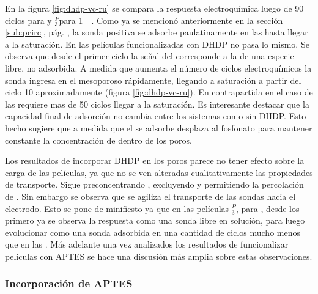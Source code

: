		    En la figura \ref{fig:dhdp-vc-ru} se compara la respuesta electroquímica luego de 90 ciclos para \pdmZ\space y \pdmZ$^P_3$\space para \ru\space \SI{1}{\milli\Molar}. Como ya se mencionó anteriormente en la sección \ref{sub:pcirc}, pág. \pageref{sub:pcirc}, la sonda positiva se adsorbe paulatinamente en las \pdmZ\space hasta llegar a la saturación. En las películas funcionalizadas con DHDP no pasa lo mismo. Se observa que desde el primer ciclo la señal del \ru\space corresponde a la de una especie libre, no adsorbida. A medida que aumenta el número de ciclos electroquímicos la sonda ingresa en el mesoporoso rápidamente, llegando a saturación a partir del ciclo 10 aproximadamente (figura \ref{fig:dhdp-vc-ru}). En contrapartida en el caso de las \pdmZ\space requiere mas de 50 ciclos llegar a la saturación. Es interesante destacar que la capacidad final de adsorción no cambia entre los sistemas con o sin DHDP. Esto hecho sugiere que a medida que el \ru\space se adsorbe desplaza al fosfonato para mantener constante la concentración de \ru\space dentro de los poros.

		    Los resultados de incorporar DHDP en los poros parece no tener efecto sobre la carga de las películas, ya que no se ven alteradas cualitativamente las propiedades de transporte. Sigue preconcentrando \ru, excluyendo \fe\space y permitiendo la percolación de \fc. Sin embargo se observa que se agiliza el transporte de las sondas hacia el electrodo. Esto se pone de minifiesto ya que en las películas \pdmZ$^P_3$, para \ru,  desde los primero ya se observa la respuesta como una sonda libre en solución, para luego evolucionar como una sonda adsorbida en una cantidad de ciclos mucho menos que en las \pdmZ. Más adelante una vez analizados los resultados de funcionalizar películas con APTES se hace una discusión más amplia sobre estas observaciones.
			

		\subsubsection{Incorporación de APTES}
			
